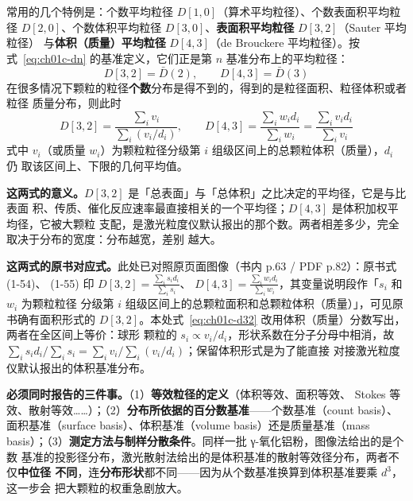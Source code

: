 \begin{principle}
常用的几个特例是：个数平均粒径 $D[1,0]$（算术平均粒径）、个数表面积平均粒径
$D[2,0]$、个数体积平均粒径 $D[3,0]$、\textbf{表面积平均粒径} $D[3,2]$（Sauter 平均粒径）
与\textbf{体积（质量）平均粒径} $D[4,3]$（de Brouckere 平均粒径）。按
式~\eqref{eq:ch01c-dn} 的基准定义，它们正是第 $n$ 基准分布上的平均粒径：
\begin{equation}\label{eq:ch01c-d32a}
D[3,2]=\bar{D}(2),\qquad D[4,3]=\bar{D}(3)
\end{equation}
在很多情况下颗粒的粒径\textbf{个数}分布是得不到的，得到的是粒径面积、粒径体积或者粒径
质量分布，则此时
\begin{equation}\label{eq:ch01c-d32}
D[3,2]=\frac{\sum_{i}v_{i}}{\sum_{i}\left(v_{i}/d_{i}\right)},\qquad
D[4,3]=\frac{\sum_{i}w_{i}d_{i}}{\sum_{i}w_{i}}=\frac{\sum_{i}v_{i}d_{i}}{\sum_{i}v_{i}}
\end{equation}
式中 $v_i$（或质量 $w_i$）为颗粒粒径分级第 $i$ 组级区间上的总颗粒体积（质量），$d_i$ 仍
取该区间上、下限的几何平均值。

\textbf{这两式的意义。}$D[3,2]$ 是「总表面」与「总体积」之比决定的平均径，它是与比表面
积、传质、催化反应速率最直接相关的一个平均径；$D[4,3]$ 是体积加权平均径，它被大颗粒
支配，是激光粒度仪默认报出的那个数。两者相差多少，完全取决于分布的宽度：分布越宽，差别
越大。

\textbf{这两式的原书对应式。}此处已对照原页面图像（书内 p.63 / PDF p.82）：原书式 (1-54)、
(1-55) 印 $D[3,2]=\frac{\sum_{i}s_{i}d_{i}}{\sum_{i}s_{i}}$、
$D[4,3]=\frac{\sum_{i}w_{i}d_{i}}{\sum_{i}w_{i}}$，其变量说明段作「$s_{i}$ 和 $w_{i}$ 为颗粒粒径
分级第 $i$ 组级区间上的总颗粒面积和总颗粒体积（质量）」，可见原书确有面积形式的
$D[3,2]$。本处式~\eqref{eq:ch01c-d32} 改用体积（质量）分数写出，两者在全区间上等价：球形
颗粒的 $s_{i}\propto v_{i}/d_{i}$，形状系数在分子分母中相消，故
$\sum_{i}s_{i}d_{i}/\sum_{i}s_{i}=\sum_{i}v_{i}/\sum_{i}(v_{i}/d_{i})$；保留体积形式是为了能直接
对接激光粒度仪默认报出的体积基准分布。
\end{principle}

\begin{measure}
\textbf{必须同时报告的三件事。}（1）\textbf{等效粒径的定义}（体积等效、面积等效、
Stokes 等效、散射等效……）；（2）\textbf{分布所依据的百分数基准}——个数基准（count
basis）、面积基准（surface basis）、体积基准（volume basis）还是质量基准（mass
basis）；（3）\textbf{测定方法与制样分散条件}。同样一批 γ-氧化铝粉，图像法给出的是个数
基准的投影径分布，激光散射法给出的是体积基准的散射等效径分布，两者不仅\textbf{中位径
不同}，连\textbf{分布形状}都不同——因为从个数基准换算到体积基准要乘 $d^{3}$，这一步会
把大颗粒的权重急剧放大。
\end{measure}

